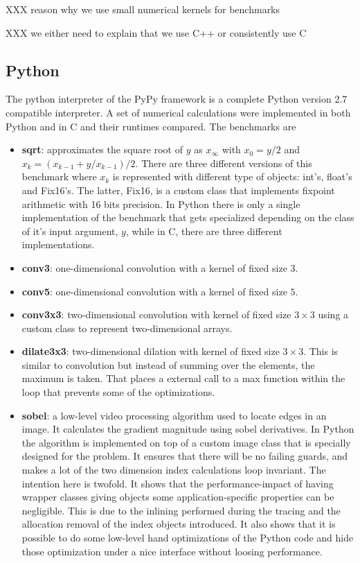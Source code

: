 \documentclass[preprint]{sigplanconf}
\begin{document}
XXX reason why we use small numerical kernels for benchmarks

XXX we either need to explain that we use C++ or consistently use C

\subsection{Python}
The python interpreter of the PyPy framework is a complete Python
version 2.7 compatible interpreter. A set of numerical
calculations were implemented in both Python and in C and their
runtimes compared. The benchmarks are
\begin{itemize}
\item {\bf sqrt}: approximates the square root of $y$ as $x_\infty$
  with $x_0=y/2$ and $x_k = \left( x_{k-1} + y/x_{k-1} \right) /
  2$. There are three different versions of this benchmark where $x_k$
  is represented with different type of objects: int's, float's and
  Fix16's. The latter, Fix16, is a custom class that implements
  fixpoint arithmetic with 16 bits precision. In Python there is only
  a single implementation of the benchmark that gets specialized
  depending on the class of it's input argument, $y$, while in C,
  there are three different implementations.
\item {\bf conv3}: one-dimensional convolution with a kernel of fixed
  size $3$.
\item {\bf conv5}: one-dimensional convolution with a kernel of fixed
  size $5$.
\item {\bf conv3x3}: two-dimensional convolution with kernel of fixed
  size $3 \times 3$ using a custom class to represent two-dimensional
  arrays.
\item {\bf dilate3x3}: two-dimensional dilation with kernel of fixed
  size $3 \times 3$. This is similar to convolution but instead of
  summing over the elements, the maximum is taken. That places a
  external call to a max function within the loop that prevents some
  of the optimizations.
\item {\bf sobel}: a low-level video processing algorithm used to
  locate edges in an image. It calculates the gradient magnitude
  using sobel derivatives. In Python the algorithm is implemented
  on top of a custom image class that is specially designed for the
  problem. It ensures that there will be no failing guards, and makes
  a lot of the two dimension index calculations loop invariant. The
  intention here is twofold. It shows that the performance-impact of
  having wrapper classes giving objects some application-specific
  properties can be negligible. This is due to the inlining performed
  during the tracing and the allocation removal of the index objects
  introduced. It also shows that it is possible to do some low-level
  hand optimizations of the Python code and hide those optimization
  under a nice interface without loosing performance.
\end{itemize}
\end{document}
